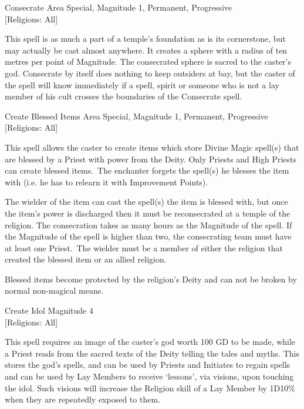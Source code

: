 \begin{samepage}
\begin{rpg-spell}
{Consecrate}
{Area Special, Magnitude 1, Permanent, Progressive\\{[Religions: All]}}

This spell is as much a part of a temple’s foundation as is its cornerstone, but may actually be cast almost anywhere. It creates a sphere with a radius of ten metres per point of Magnitude. The consecrated sphere is sacred to the caster’s god. Consecrate by itself does nothing to keep outsiders at bay, but the caster of the spell will know immediately if a spell, spirit or someone who is not a lay member of his cult crosses the boundaries of the Consecrate spell.
\end{rpg-spell}
\end{samepage}

\begin{samepage}
\begin{rpg-spell}
{Create Blessed Items}
{Area Special, Magnitude 1, Permanent, Progressive\\{[Religions: All]}}

This spell allows the caster to create items which store Divine Magic spell(s) that are blessed by a Priest with power from the Deity. Only Priests and High Priests can create blessed items. The enchanter forgets the spell(s) he blesses the item with (i.e. he has to relearn it with Improvement Points).

The wielder of the item can cast the spell(s) the item is blessed with, but once the item’s power is discharged then it must be reconsecrated at a temple of the religion. The consecration takes as many hours as the Magnitude of the spell. If the Magnitude of the spell is higher than two, the consecrating team must have at least one Priest. The wielder must be a member of either the religion that created the blessed item or an allied religion. 

Blessed items become protected by the religion’s Deity and can not be broken by normal non-magical means. 
\end{rpg-spell}
\end{samepage}

\begin{samepage}
\begin{rpg-spell}
{Create Idol}
{Magnitude 4\\{[Religions: All]}}

This spell requires an image of the caster’s god worth 100 GD to be made, while a Priest reads from the sacred texts of the Deity telling the tales and myths. This stores the god’s spells, and can be used by Priests and Initiates to regain spells and can be used by Lay Members to receive ‘lessons’, via visions, upon touching the idol. Such visions will increase the Religion skill of a Lay Member by 1D10\% when they are repeatedly exposed to them. 
\end{rpg-spell}
\end{samepage}

